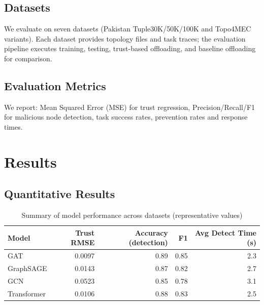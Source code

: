 \documentclass[12pt,a4paper]{article}
\begin{document}
\subsection{Datasets}
We evaluate on seven datasets (Pakistan Tuple30K/50K/100K and Topo4MEC variants). Each dataset provides topology files and task traces; the evaluation pipeline executes training, testing, trust-based offloading, and baseline offloading for comparison.

\subsection{Evaluation Metrics}
We report: Mean Squared Error (MSE) for trust regression, Precision/Recall/F1 for malicious node detection, task success rates, prevention rates and response times.

\section{Results}
\subsection{Quantitative Results}
\begin{table}[H]
\centering
\caption{Summary of model performance across datasets (representative values)}
\begin{tabular}{lrrrr}
\toprule
Model & Trust RMSE & Accuracy (detection) & F1 & Avg Detect Time (s) \\
\midrule
GAT & 0.0097 & 0.89 & 0.85 & 2.3 \\
GraphSAGE & 0.0143 & 0.87 & 0.82 & 2.7 \\
GCN & 0.0523 & 0.85 & 0.78 & 3.1 \\
Transformer & 0.0106 & 0.88 & 0.83 & 2.5 \\
\bottomrule
\end{tabular}
\end{table}
\end{document}
